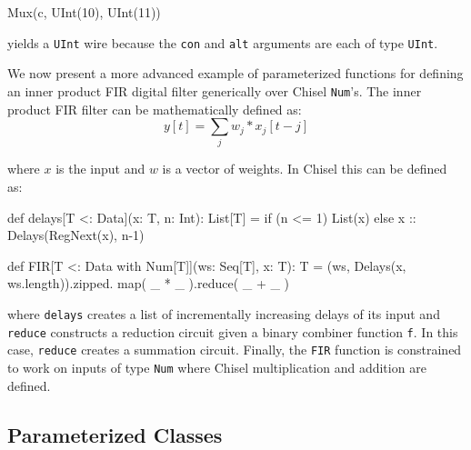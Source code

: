 \documentclass[twocolumn,10pt]{article}
\def\code#1{{\tt #1}}
\begin{document}
\begin{scala}
Mux(c, UInt(10), UInt(11))
\end{scala}

\noindent
yields a \code{UInt} wire because the \code{con} and \code{alt} arguments are each of type \code{UInt}.

% 
% 

We now present a more advanced example of parameterized functions for defining an inner product FIR digital filter generically over Chisel \code{Num}'s.
The inner product FIR filter can be mathematically defined as:
\begin{equation}
y[t] = \sum_j w_j * x_j[t-j]
\end{equation}

\noindent 
where $x$ is the input and $w$ is a vector of weights.
In Chisel this can be defined as:

\begin{scala}
def delays[T <: Data](x: T, n: Int): List[T] = 
  if (n <= 1) List(x) else x :: Delays(RegNext(x), n-1)

def FIR[T <: Data with Num[T]](ws: Seq[T], x: T): T = 
  (ws, Delays(x, ws.length)).zipped.
    map( _ * _ ).reduce( _ + _ )
\end{scala}
 
\noindent
where 
\code{delays} creates a list of incrementally increasing delays of its input and
\code{reduce} constructs a reduction circuit given a binary combiner function \code{f}.  
In this case, \code{reduce} creates a summation circuit.
Finally, the \code{FIR} function is constrained to work on inputs of type \code{Num} where Chisel multiplication and addition are defined.

\subsection{Parameterized Classes}
\end{document}
